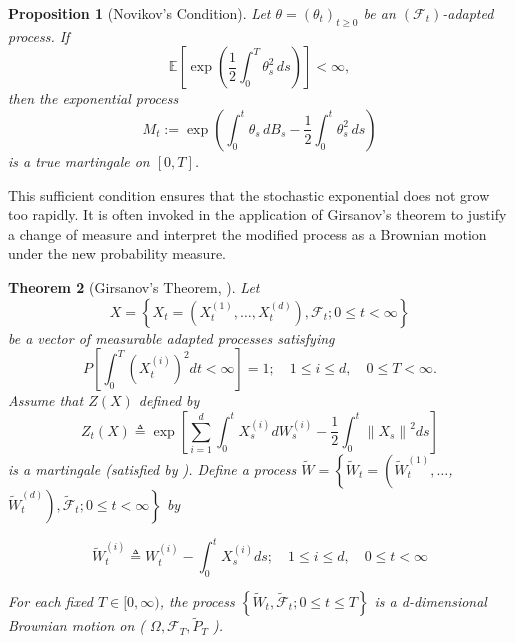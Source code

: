 \documentclass[11pt, twoside]{report}
\newtheorem{theorem}{Theorem}[section]
\newtheorem{proposition}[theorem]{Proposition}
\begin{document}
\begin{proposition}[Novikov’s Condition] \label{nov_cond}
Let $\theta = (\theta_t)_{t \geq 0}$ be an $(\mathcal{F}_t)$-adapted process. If
\[
\mathbb{E} \left[ \exp\left( \frac{1}{2} \int_0^T \theta_s^2 \, ds \right) \right] < \infty,
\]
then the exponential process
\[
M_t := \exp\left( \int_0^t \theta_s \, dB_s - \frac{1}{2} \int_0^t \theta_s^2 \, ds \right)
\]
is a true martingale on $[0,T]$.
\end{proposition}
\medskip

This sufficient condition ensures that the stochastic exponential does not grow too rapidly. It is often invoked in the application of Girsanov's theorem to justify a change of measure and interpret the modified process as a Brownian motion under the new probability measure.

\begin{theorem}[Girsanov's Theorem, \texorpdfstring{\cite[Theorem~5.1]{Karatzas1991-xr}}{}]
Let $$X=\left\{X_t=\left(X_t^{(1)}, \ldots, X_t^{(d)}\right), \mathcal{F}_t ; 0 \leq t<\infty\right\}$$ be a vector of measurable adapted processes satisfying
$$
P\left[\int_0^T\left(X_t^{(i)}\right)^2 d t<\infty\right]=1 ; \quad 1 \leq i \leq d, \quad 0 \leq T<\infty.
$$
Assume that $Z(X)$ defined by 
$$
Z_t(X) \triangleq \exp \left[\sum_{i=1}^d \int_0^t X_s^{(i)} d W_s^{(i)}-\frac{1}{2} \int_0^t\left\|X_s\right\|^2 d s\right]
$$
is a martingale (satisfied by \cite[Corollary 5.13 of Novikov Condition]{Karatzas1991-xr}). Define a process $\tilde{W}=\left\{\tilde{W}_t=\left(\tilde{W}_t^{(1)}, \ldots\right.\right.$, $\left.\left.\tilde{W}_t^{(d)}\right), \tilde{\mathcal{F}}_t ; 0 \leq t<\infty\right\}$ by

$$
\tilde{W}_t^{(i)} \triangleq W_t^{(i)}-\int_0^t X_s^{(i)} d s ; \quad 1 \leq i \leq d, \quad 0 \leq t<\infty
$$


For each fixed $T \in[0, \infty)$, the process $\left\{\tilde{W}_t, \tilde{\mathcal{F}}_t ; 0 \leq t \leq T\right\}$ is a d-dimensional Brownian motion on ( $\Omega, \mathcal{F}_T, \widetilde{P}_T$ ).
\end{theorem}

\end{document}
